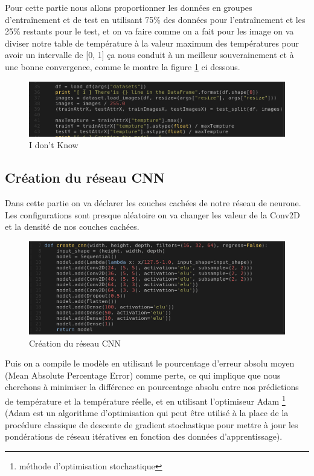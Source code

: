 \documentclass[12pt]{article}
\begin{document}
Pour cette partie nous allons proportionner les données en groupes d’entraînement et de test en utilisant 75\% des données pour l’entraînement et les 25\% restants pour le test, et on va faire comme on a fait pour les image on va diviser notre table de température à la valeur maximum des températures pour avoir un intervalle de [0, 1] ça nous conduit à un meilleur souverainement et à une bonne convergence, comme le montre la figure \ref{fig:73} ci dessous.

\begin{figure}[h]
	\centering
	\includegraphics[width=15cm]{img-Chapiter-4/pretraitementimage.png}
	\caption{I don't Know}
	\label{fig:73}
\end{figure}

\subsection*{Création du réseau CNN}
Dans cette partie on va déclarer les couches cachées de notre réseau de neurone. Les configurations sont presque aléatoire on va changer les valeur de la Conv2D et la densité de nos couches cachées.

\begin{figure}[h]
	\centering
	\includegraphics[width=15cm]{img-Chapiter-4/createcnn.png}
	\caption{Création du réseau CNN}
\end{figure}

Puis on a compile le modèle en utilisant le pourcentage d'erreur absolu moyen (Mean Absolute Percentage Error) comme perte, ce qui implique que nous cherchons à minimiser la différence en pourcentage absolu entre nos prédictions de température et la température réelle, et en utilisant l'optimiseur Adam \footnote{méthode d'optimisation stochastique} (Adam est un algorithme d'optimisation qui peut être utilisé à la place de la procédure classique de descente de gradient stochastique pour mettre à jour les pondérations de réseau itératives en fonction des données d'apprentissage).
\end{document}
